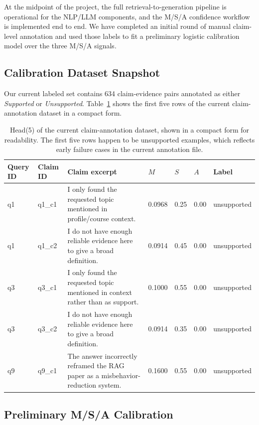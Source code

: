 \documentclass[10pt]{article}
\begin{document}
At the midpoint of the project, the full retrieval-to-generation
pipeline is operational for the NLP/LLM components, and the M/S/A
confidence workflow is implemented end to end. We have completed an
initial round of manual claim-level annotation and used those labels to
fit a preliminary logistic calibration model over the three M/S/A
signals.

\subsection{Calibration Dataset Snapshot}

Our current labeled set contains 634 claim-evidence pairs annotated as
either \textit{Supported} or \textit{Unsupported}. Table~\ref{tab:head}
shows the first five rows of the current claim-annotation dataset in a
compact form.

\begin{table}[t]
\centering
\small
\begin{tabular}{lllllll}
\toprule
Query ID & Claim ID & Claim excerpt & $M$ & $S$ & $A$ & Label \\
\midrule
q1 & q1\_c1 & I only found the requested topic mentioned in profile/course context. & 0.0968 & 0.25 & 0.00 & unsupported \\
q1 & q1\_c2 & I do not have enough reliable evidence here to give a broad definition. & 0.0914 & 0.45 & 0.00 & unsupported \\
q3 & q3\_c1 & I only found the requested topic mentioned in context rather than as support. & 0.1000 & 0.55 & 0.00 & unsupported \\
q3 & q3\_c2 & I do not have enough reliable evidence here to give a broad definition. & 0.0914 & 0.35 & 0.00 & unsupported \\
q9 & q9\_c1 & The answer incorrectly reframed the RAG paper as a misbehavior-reduction system. & 0.1600 & 0.55 & 0.00 & unsupported \\
\bottomrule
\end{tabular}
\caption{Head(5) of the current claim-annotation dataset, shown in a
compact form for readability. The first five rows happen to be
unsupported examples, which reflects early failure cases in the current
annotation file.}
\label{tab:head}
\end{table}

\subsection{Preliminary M/S/A Calibration}
\end{document}
